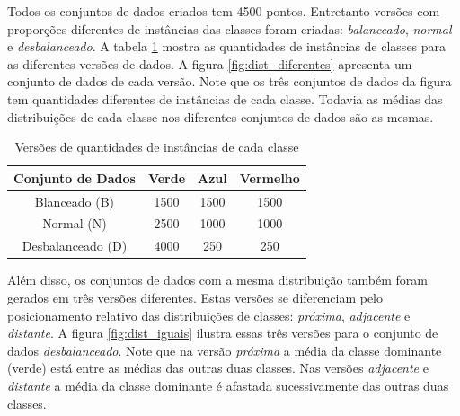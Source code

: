 Todos os conjuntos de dados criados tem 4500 pontos.
Entretanto versões com proporções diferentes de instâncias das classes foram criadas: \textit{balanceado}, \textit{normal} e \textit{desbalanceado}.
A tabela \ref{tab:dados_sinteticos} mostra as quantidades de instâncias de classes para as diferentes versões de dados.
A figura \ref{fig:dist_diferentes} apresenta um conjunto de dados de cada versão.
Note que os três conjuntos de dados da figura tem quantidades diferentes de instâncias de cada classe.
Todavia as médias das distribuições de cada classe nos diferentes conjuntos de dados são as mesmas.

\begin{table}[h!]
  \begin{center}
    \begin{tabular}{cccc}
      \hline
      \textbf{Conjunto de Dados} & \textbf{Verde} & \textbf{Azul} & \textbf{Vermelho}\\
      \hline

Blanceado (B)	&	 1500 & 1500 & 1500	\\
Normal (N)	&	 2500 & 1000 & 1000	\\
Desbalanceado (D)      & 4000 & 250 & 250	\\

      \hline
    \end{tabular}
    \caption{Versões de quantidades de instâncias de cada classe}
    \label{tab:dados_sinteticos}
  \end{center}
\end{table}

Além disso, os conjuntos de dados com a mesma distribuição também foram gerados em três versões diferentes.
Estas versões se diferenciam pelo posicionamento relativo das distribuições de classes: \textit{próxima}, \textit{adjacente} e \textit{distante}.
A figura \ref{fig:dist_iguais} ilustra essas três versões para o conjunto de dados \textit{desbalanceado}.
Note que na versão \textit{próxima} a média da classe dominante (verde) está entre as médias das outras duas classes.
Nas versões \textit{adjacente} e \textit{distante} a média da classe dominante é afastada sucessivamente das outras duas classes.


